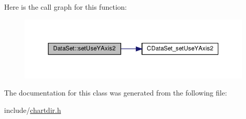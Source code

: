 Here is the call graph for this function\+:
\nopagebreak
\begin{figure}[H]
\begin{center}
\leavevmode
\includegraphics[width=350pt]{class_data_set_a012ae8bc45533d67340c82a82b2f7f92_cgraph}
\end{center}
\end{figure}


The documentation for this class was generated from the following file\+:\begin{DoxyCompactItemize}
\item 
include/\hyperlink{chartdir_8h}{chartdir.\+h}\end{DoxyCompactItemize}

